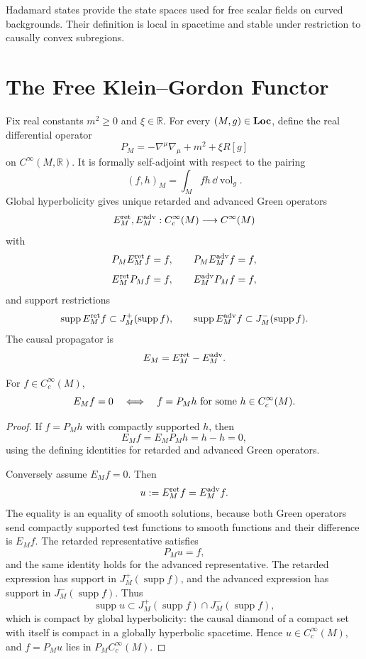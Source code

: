 Hadamard states provide the state spaces used for free scalar fields on
curved backgrounds.  Their definition is local in spacetime and stable under
restriction to causally convex subregions.

\section{The Free Klein--Gordon Functor}

Fix real constants \(m^2\ge0\) and \(\xi\in\mathbb R\).  For every
\((M,g)\in{\bf Loc}\), define the real differential operator
\[
  P_M=-\nabla^\mu\nabla_\mu+m^2+\xi R[g]
\]
on \(C^\infty(M,\mathbb R)\).  It is formally self-adjoint with respect to
the pairing
\[
  (f,h)_M=\int_M f h\,\dd\operatorname{vol}_g .
\]
Global hyperbolicity gives unique retarded and advanced Green operators
\[
  E_M^{\rm ret},E_M^{\rm adv}:C_c^\infty(M)\longrightarrow C^\infty(M)
\]
with
\[
  P_M E_M^{\rm ret}f=f,\qquad
  P_M E_M^{\rm adv}f=f,
\]
\[
  E_M^{\rm ret}P_M f=f,\qquad
  E_M^{\rm adv}P_M f=f,
\]
and support restrictions
\[
  \operatorname{supp}E_M^{\rm ret}f\subset J_M^+(\operatorname{supp}f),
  \qquad
  \operatorname{supp}E_M^{\rm adv}f\subset J_M^-(\operatorname{supp}f).
\]
The causal propagator is
\[
  E_M=E_M^{\rm ret}-E_M^{\rm adv}.
\]

\begin{lemma}
\label{lem:kg-causal-propagator-kernel}
For \(f\in C_c^\infty(M)\),
\[
  E_M f=0
  \quad\Longleftrightarrow\quad
  f=P_M h\hbox{ for some }h\in C_c^\infty(M).
\]
\end{lemma}

\begin{proof}
If \(f=P_Mh\) with compactly supported \(h\), then
\[
  E_M f=E_M P_M h=h-h=0,
\]
using the defining identities for retarded and advanced Green operators.

Conversely assume \(E_Mf=0\).  Then
\[
  u:=E_M^{\rm ret}f=E_M^{\rm adv}f .
\]
The equality is an equality of smooth solutions, because both Green
operators send compactly supported test functions to smooth functions and
their difference is \(E_Mf\).  The retarded representative satisfies
\[
  P_Mu=f,
\]
and the same identity holds for the advanced representative.
The retarded expression has support in \(J_M^+(\operatorname{supp}f)\), and
the advanced expression has support in \(J_M^-(\operatorname{supp}f)\).
Thus
\[
  \operatorname{supp}u
  \subset
  J_M^+(\operatorname{supp}f)\cap J_M^-(\operatorname{supp}f),
\]
which is compact by global hyperbolicity: the causal diamond of a compact set
with itself is compact in a globally hyperbolic spacetime.  Hence
\(u\in C_c^\infty(M)\), and \(f=P_Mu\) lies in
\(P_M C_c^\infty(M)\).
\end{proof}

